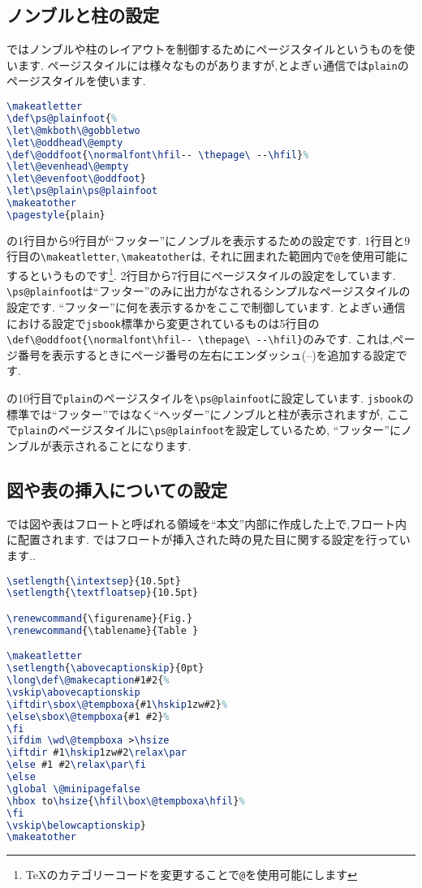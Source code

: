 \subsection{ノンブルと柱の設定}

{\pLaTeX}ではノンブルや柱のレイアウトを制御するためにページスタイルというものを使います.
ページスタイルには様々なものがありますが,とよぎぃ通信では\verb|plain|のページスタイルを使います.

\begin{lstlisting}[caption = ノンブルと柱の設定, label = list:footer, language=tex]
\makeatletter
\def\ps@plainfoot{%
\let\@mkboth\@gobbletwo
\let\@oddhead\@empty
\def\@oddfoot{\normalfont\hfil-- \thepage\ --\hfil}%
\let\@evenhead\@empty
\let\@evenfoot\@oddfoot}
\let\ps@plain\ps@plainfoot
\makeatother
\pagestyle{plain}
\end{lstlisting}

の1行目から9行目が``フッター''にノンブルを表示するための設定です.
1行目と9行目の\verb|\makeatletter|,\,\verb|\makeatother|は,
それに囲まれた範囲内で\texttt{@}を使用可能にするというものです\footnote{{\TeX}のカテゴリーコードを変更することで\texttt{@}を使用可能にします}.
2行目から7行目にページスタイルの設定をしています.
\verb|\ps@plainfoot|は``フッター''のみに出力がなされるシンプルなページスタイルの設定です.
``フッター''に何を表示するかをここで制御しています.
とよぎぃ通信における設定で\verb|jsbook|標準から変更されているものは5行目の\verb|\def\@oddfoot{\normalfont\hfil-- \thepage\ --\hfil}|のみです.
これは,ページ番号を表示するときにページ番号の左右にエンダッシュ(--)を追加する設定です.

の10行目で\verb|plain|のページスタイルを\verb|\ps@plainfoot|に設定しています.
\verb|jsbook|の標準では``フッター''ではなく``ヘッダー''にノンブルと柱が表示されますが,
ここで\verb|plain|のページスタイルに\verb|\ps@plainfoot|を設定しているため,
``フッター''にノンブルが表示されることになります.

\subsection{図や表の挿入についての設定}

{\pLaTeX}では図や表はフロートと呼ばれる領域を``本文''内部に作成した上で,フロート内に配置されます.
ではフロートが挿入された時の見た目に関する設定を行っています..
\begin{lstlisting}[caption = フロートついての設定, label = list:float, language = tex]
\setlength{\intextsep}{10.5pt}
\setlength{\textfloatsep}{10.5pt}

\renewcommand{\figurename}{Fig.}
\renewcommand{\tablename}{Table }

\makeatletter
\setlength{\abovecaptionskip}{0pt}
\long\def\@makecaption#1#2{%
\vskip\abovecaptionskip
\iftdir\sbox\@tempboxa{#1\hskip1zw#2}%
\else\sbox\@tempboxa{#1 #2}%
\fi
\ifdim \wd\@tempboxa >\hsize
\iftdir #1\hskip1zw#2\relax\par
\else #1 #2\relax\par\fi
\else
\global \@minipagefalse
\hbox to\hsize{\hfil\box\@tempboxa\hfil}%
\fi
\vskip\belowcaptionskip}
\makeatother
\end{lstlisting}

